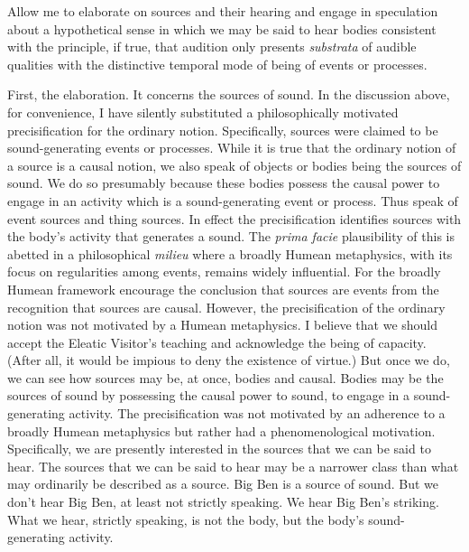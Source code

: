 Allow me to elaborate on sources and their hearing and engage in speculation about a hypothetical sense in which we may be said to hear bodies consistent with the principle, if true, that audition only presents \emph{substrata} of audible qualities with the distinctive temporal mode of being of events or processes.

First, the elaboration. It concerns the sources of sound. In the discussion above, for convenience, I have silently substituted a philosophically motivated precisification for the ordinary notion. Specifically, sources were claimed to be sound-generating events or processes. While it is true that the ordinary notion of a source is a causal notion, we also speak of objects or bodies being the sources of sound. We do so presumably because these bodies possess the causal power to engage in an activity which is a sound-generating event or process. Thus \citet{Casati:2013ca} speak of event sources and thing sources. In effect the precisification identifies sources with the body's activity that generates a sound. The \emph{prima facie} plausibility of this is abetted in a philosophical \emph{milieu} where a broadly Humean metaphysics, with its focus on regularities among events, remains widely influential. For the broadly Humean framework encourage the conclusion that sources are events from the recognition that sources are causal. However, the precisification of the ordinary notion was not motivated by a Humean metaphysics. I believe that we should accept the Eleatic Visitor's teaching and acknowledge the being of capacity. (After all, it would be impious to deny the existence of virtue.) But once we do, we can see how sources may be, at once, bodies and causal. Bodies may be the sources of sound by possessing the causal power to sound, to engage in a sound-generating activity. The precisification was not motivated by an adherence to a broadly Humean metaphysics but rather had a phenomenological motivation. Specifically, we are presently interested in the sources that we can be said to hear. The sources that we can be said to hear may be a narrower class than what may ordinarily be described as a source. Big Ben is a source of sound. But we don't hear Big Ben, at least not strictly speaking. We hear Big Ben's striking. What we hear, strictly speaking, is not the body, but the body's sound-generating activity. 

